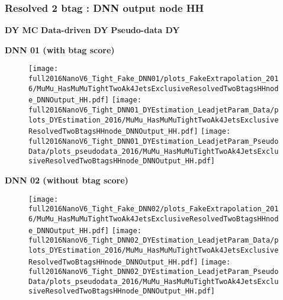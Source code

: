 \documentclass[9pt]{beamer}
\begin{document}
\begin{frame}
	\frametitle{Resolved 2 btag : DNN output node HH}
    \hspace{2cm} \textbf{DY MC} \hspace{1.9cm} \textbf{Data-driven DY} \hspace{1cm} \textbf{Pseudo-data DY}
    \begin{center}
        \textbf{DNN 01 (with btag score)}
    \end{center}
	\begin{figure}
		\texttt{[image: full2016NanoV6\_Tight\_Fake\_DNN01/plots\_FakeExtrapolation\_2016/MuMu\_HasMuMuTightTwoAk4JetsExclusiveResolvedTwoBtagsHHnode\_DNNOutput\_HH.pdf]}
		\texttt{[image: full2016NanoV6\_Tight\_DNN01\_DYEstimation\_LeadjetParam\_Data/plots\_DYEstimation\_2016/MuMu\_HasMuMuTightTwoAk4JetsExclusiveResolvedTwoBtagsHHnode\_DNNOutput\_HH.pdf]}
		\texttt{[image: full2016NanoV6\_Tight\_DNN01\_DYEstimation\_LeadjetParam\_PseudoData/plots\_pseudodata\_2016/MuMu\_HasMuMuTightTwoAk4JetsExclusiveResolvedTwoBtagsHHnode\_DNNOutput\_HH.pdf]}
	\end{figure}
    \begin{center}
        \textbf{DNN 02 (without btag score)}
    \end{center}
	\begin{figure}
		\texttt{[image: full2016NanoV6\_Tight\_Fake\_DNN02/plots\_FakeExtrapolation\_2016/MuMu\_HasMuMuTightTwoAk4JetsExclusiveResolvedTwoBtagsHHnode\_DNNOutput\_HH.pdf]}
		\texttt{[image: full2016NanoV6\_Tight\_DNN02\_DYEstimation\_LeadjetParam\_Data/plots\_DYEstimation\_2016/MuMu\_HasMuMuTightTwoAk4JetsExclusiveResolvedTwoBtagsHHnode\_DNNOutput\_HH.pdf]}
		\texttt{[image: full2016NanoV6\_Tight\_DNN02\_DYEstimation\_LeadjetParam\_PseudoData/plots\_pseudodata\_2016/MuMu\_HasMuMuTightTwoAk4JetsExclusiveResolvedTwoBtagsHHnode\_DNNOutput\_HH.pdf]}
	\end{figure}
\end{frame}
\end{document}
